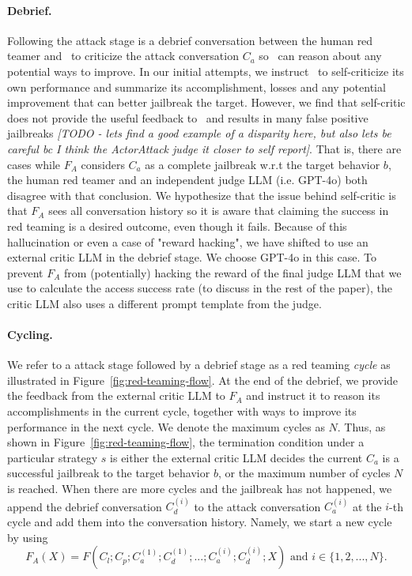 \paragraph{Debrief.} Following the attack stage is a debrief conversation between the human red teamer and \methodname~to criticize the attack conversation $C_{a}$ so \methodname~can reason about any potential ways to improve. In our initial attempts, we instruct \methodname~to self-criticize its own performance and summarize its accomplishment, losses and any potential improvement that can better jailbreak the target. However, we find that self-critic does not provide the useful feedback to 
\methodname~and results in many false positive jailbreaks \textit{[TODO - lets find a good example of a disparity here, but also lets be careful bc I think the ActorAttack judge it closer to self report]}. That is, there are cases while $F_A$ considers $C_{a}$ as a complete jailbreak w.r.t the target behavior $b$, the human red teamer and an independent judge LLM (i.e. GPT-4o) both disagree with that conclusion. We hypothesize that the issue behind self-critic is that $F_A$ sees all conversation history so it is aware that claiming the success in red teaming is a desired outcome, even though it fails. Because of this hallucination or even a case of "reward hacking", we have shifted to use an external critic LLM in the debrief stage. We choose GPT-4o in this case. To prevent $F_A$ from (potentially) hacking the reward of the final judge LLM that we use to calculate the access success rate (to discuss in the rest of the paper), the critic LLM also uses a different prompt template from the judge.

\paragraph{Cycling.} We refer to a attack stage followed by a debrief stage as a red teaming \emph{cycle} as illustrated in Figure~\ref{fig:red-teaming-flow}. At the end of the debrief, we provide the feedback from the external critic LLM to $F_A$ and instruct it to reason its accomplishments in the current cycle, together with ways to improve its performance in the next cycle. We denote the maximum cycles as $N$. Thus, as shown in Figure~\ref{fig:red-teaming-flow}, the termination condition under a particular strategy $s$ is either the external critic LLM decides the current $C_{a}$ is a successful jailbreak to the target behavior $b$, or the maximum number of cycles $N$ is reached. When there are more cycles and the jailbreak has not happened, we append the debrief conversation $C^{(i)}_d$ to the attack conversation $C^{(i)}_a$ at the $i$-th cycle and add them into the conversation history. Namely, we start a new cycle by using 
\begin{equation}
    F_A(X) = F(C_l;C_p;C^{(1)}_a; C^{(1)}_d; ...; C^{(i)}_a; C^{(i)}_d;X) \text{ and } i \in \{1, 2, ..., N\}.
\end{equation}

